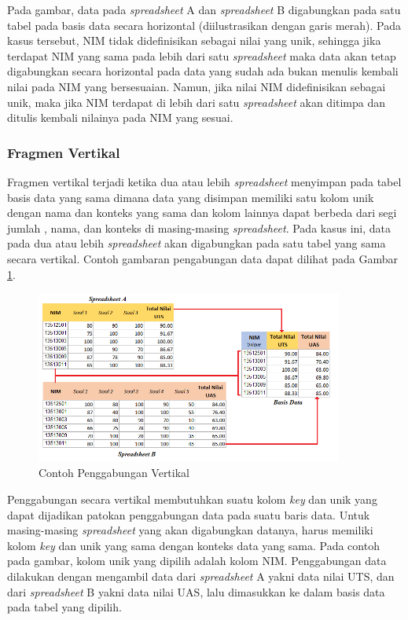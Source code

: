 	Pada gambar, data pada \textit{spreadsheet} A dan \textit{spreadsheet} B digabungkan pada satu tabel pada basis data secara horizontal (diilustrasikan dengan garis merah). Pada kasus tersebut, NIM tidak didefinisikan sebagai nilai yang unik, sehingga jika terdapat NIM yang sama pada lebih dari satu \textit{spreadsheet} maka data akan tetap digabungkan secara horizontal pada data yang sudah ada bukan menulis kembali nilai pada NIM yang bersesuaian. Namun, jika nilai NIM didefinisikan sebagai unik, maka jika NIM terdapat di lebih dari satu \textit{spreadsheet} akan ditimpa dan ditulis kembali nilainya pada NIM yang sesuai.

	\subsubsection{Fragmen Vertikal}
	Fragmen vertikal terjadi ketika dua atau lebih \textit{spreadsheet} menyimpan pada tabel basis data yang sama dimana data yang disimpan memiliki satu kolom unik dengan nama dan konteks yang sama dan kolom lainnya dapat berbeda dari segi jumlah , nama, dan konteks di masing-masing \textit{spreadsheet}. Pada kasus ini, data pada dua atau lebih \textit{spreadsheet} akan digabungkan pada satu tabel yang sama secara vertikal. Contoh gambaran pengabungan data dapat dilihat pada Gambar \ref{VerticalMerge}.

	\begin{figure}[htb]
	    \centering
	    \includegraphics[width=0.9\textwidth]{resources/chapter-3-vertical-merge.png}
	    \caption{Contoh Penggabungan Vertikal}
		\label{VerticalMerge}
	\end{figure}

	Penggabungan secara vertikal membutuhkan suatu kolom \textit{key} dan unik yang dapat dijadikan patokan penggabungan data pada suatu baris data. Untuk masing-masing \textit{spreadsheet} yang akan digabungkan datanya, harus memiliki kolom \textit{key} dan unik yang sama dengan konteks data yang sama. Pada contoh pada gambar, kolom unik yang dipilih adalah kolom NIM. Penggabungan data dilakukan dengan mengambil data dari \textit{spreadsheet} A yakni data nilai UTS, dan dari \textit{spreadsheet} B yakni data nilai UAS, lalu dimasukkan ke dalam basis data pada tabel yang dipilih.

